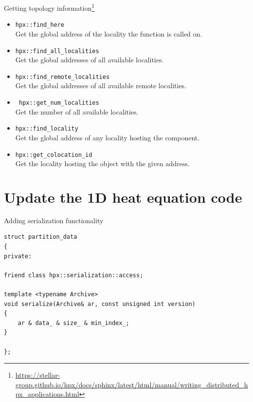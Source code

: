 \documentclass[12pt,t]{beamer}
\begin{document}
\begin{frame}{Getting topology information\footnote{\tiny\url{https://stellar-group.github.io/hpx/docs/sphinx/latest/html/manual/writing_distributed_hpx_applications.html}}}

\begin{itemize}
\item \lstinline|hpx::find_here| \\
Get the global address of the locality the function is called on.

\item \lstinline|hpx::find_all_localities| \\
Get the global addresses of all available localities.

\item \lstinline|hpx::find_remote_localities| \\
Get the global addresses of all available remote localities.

\item \lstinline| hpx::get_num_localities| \\
Get the number of all available localities.

\item \lstinline|hpx::find_locality| \\
Get the global address of any locality hosting the component.

\item \lstinline|hpx::get_colocation_id| \\
Get the locality hosting the object with the given address.
\end{itemize}

\end{frame}

\section{Update the 1D heat equation code}


\begin{frame}[fragile]{Adding serialization functionality}

\begin{lstlisting}
struct partition_data
{
private:
 
friend class hpx::serialization::access;

template <typename Archive>
void serialize(Archive& ar, const unsigned int version)
{
    ar & data_ & size_ & min_index_;
}

};
\end{lstlisting}


\end{frame}
\end{document}
